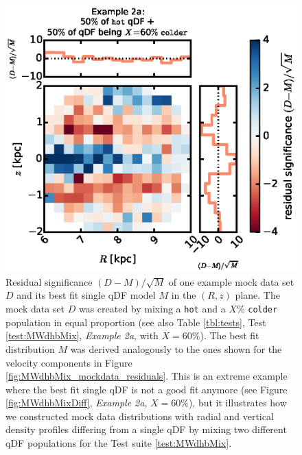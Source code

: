 \documentclass[iop,revtex4,numberedappendix,appendixfloats]{emulateapj}
\begin{document}
\begin{figure}[!htbp]
\centering
\includegraphics[width=\columnwidth]{MWbdhMixDiff_hot_2kpc_0.6_a_residual_RvsZ.eps}
\caption{Residual significance $(D-M)/\sqrt{M}$ of one example mock data set $D$ and its best fit single qDF model $M$ in the $(R,z)$ plane. The mock data set $D$ was created by mixing a \texttt{hot} and a $X\%$ \texttt{colder} population in equal proportion (see also Table \ref{tbl:tests}, Test \ref{test:MWdhbMix}, \emph{Example 2a}, with $X=60\%$). The best fit distribution $M$ was derived analogously to the ones shown for the velocity components in Figure \ref{fig:MWdhbMix_mockdata_residuals}. This is an extreme example where the best fit single qDF is not a good fit anymore (see Figure \ref{fig:MWdhbMixDiff}, \emph{Example 2a}, $X=60\%$), but it illustrates how we constructed mock data distributions with radial and vertical density profiles differing from a single qDF by mixing two different qDF populations for the Test suite \ref{test:MWdhbMix}.}
\label{fig:MWbdhMix_residual_RvsZ}
\end{figure}
\end{document}
